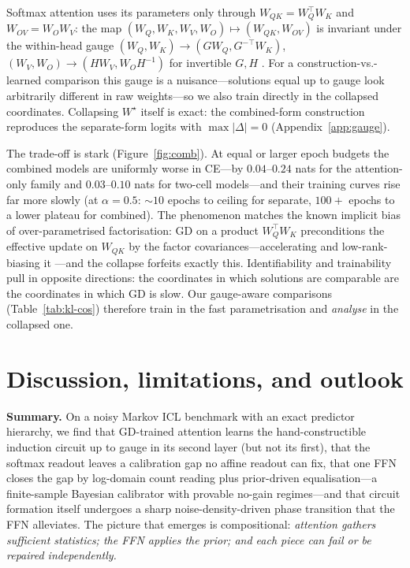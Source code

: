 \documentclass{article} %
\newcommand{\Wstar}{W^{\star}}
\newcommand{\WQK}{W_{QK}}
\newcommand{\WOV}{W_{OV}}
\begin{document}
Softmax attention uses its parameters only through $\WQK=W_Q^{\top}W_K$ and
$\WOV=W_OW_V$: the map $(W_Q,W_K,W_V,W_O)\mapsto(\WQK,\WOV)$ is invariant under the
within-head gauge $(W_Q,W_K)\to(GW_Q, G^{-\top}W_K)$,
$(W_V,W_O)\to(HW_V,W_OH^{-1})$ for invertible $G,H$
\citep{elhage2021mathematical,vannierop2024transformer}. For a
construction-vs.-learned comparison this gauge is a nuisance---solutions equal up to
gauge look arbitrarily different in raw weights---so we also train directly in the
collapsed coordinates. Collapsing $\Wstar$ itself is exact: the combined-form
construction reproduces the separate-form logits with $\max|\Delta|=0$
(Appendix~\ref{app:gauge}).

The trade-off is stark (Figure~\ref{fig:comb}). At equal or larger epoch budgets the
combined models are uniformly worse in CE---by $0.04$--$0.24$ nats for the
attention-only family and $0.03$--$0.10$ nats for two-cell models---and their
training curves rise far more slowly (at $\alpha=0.5$: ${\sim}10$ epochs to ceiling
for separate, $100{+}$ epochs to a lower plateau for combined). The phenomenon
matches the known implicit bias of over-parametrised factorisation: GD on a product
$W_Q^\top W_K$ preconditions the effective update on $\WQK$ by the factor
covariances---accelerating and low-rank-biasing it
\citep{arora2018optimization,kobayashi2024weight}---and the collapse forfeits exactly
this. Identifiability and trainability pull in opposite directions: the coordinates
in which solutions are comparable are the coordinates in which GD is slow. Our
gauge-aware comparisons (Table~\ref{tab:kl-cos}) therefore train in the fast
parametrisation and \emph{analyse} in the collapsed one.

\section{Discussion, limitations, and outlook}
\label{sec:discussion}

\textbf{Summary.} On a noisy Markov ICL benchmark with an exact predictor hierarchy,
we find that GD-trained attention learns the hand-constructible induction circuit up
to gauge in its second layer (but not its first), that the softmax readout leaves a
calibration gap no affine readout can fix, that one FFN closes the gap by log-domain
count reading plus prior-driven equalisation---a finite-sample Bayesian calibrator
with provable no-gain regimes---and that circuit formation itself undergoes a sharp
noise-density-driven phase transition that the FFN alleviates. The picture that
emerges is compositional: \emph{attention gathers sufficient statistics; the FFN
applies the prior; and each piece can fail or be repaired independently.}
\end{document}
